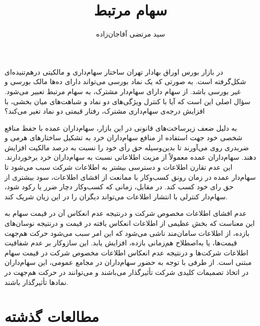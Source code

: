 \documentclass[12pt]{article}
\begin{document}
\title{سهام مرتبط}
\author{سید مرتضی آقاجان‌زاده}
\maketitle

در بازار بورس اوراق بهادار تهران ساختار سهام‌داری و مالکیتی درهم‌تنیده‌ای شکل‌گرفته است. به صورتی که یک نماد بورسی می‌تواند دارای ده‌ها مالک بورسی و غیر بورسی باشد. از سهام دارای سهام‌دار مشترک، به سهام مرتبط
 تعبیر می‌شود. سؤال اصلی این است که آیا با کنترل ویژگی‌های دو نماد و شباهت‌های میان بخشی، با افزایش درجه‌ی سهام‌داری مشترک، رفتار قیمتی دو نماد تغیر می‌کند؟ 

به دلیل ضعف زیرساخت‌های قانونی در این بازار، سهام‌داران عمده با حفظ منافع شخصی خود جهت استفاده از منافع سهام‌داران خرد به تشکیل ساختارهای هرمی 
و ضربدری 
روی می‌آورند تا بدین‌وسیله  حق رأی خود را نسبت به درصد مالکیت افزایش دهند. سهام‌داران عمده معمولاً از مزیت اطلاعاتی نسبت به سهام‌داران خرد برخوردارند.
این عدم تقارن اطلاعات و دسترسی بیشتر به اطلاعات شرکت سبب می‌شود تا سهام‌دار عمده در زمان رونق کسب‌وکار با ممانعت از افشای اطلاعات، سود بیشتری از حق رای خود کسب کند. در مقابل، زمانی که کسب‌وکار دچار ضرر یا رکود شود، سهام‌دار کنترلی با انتشار اطلاعات می‌تواند دیگران را در این زیان شریک کند.


عدم افشای اطلاعات مخصوص شرکت و درنتیجه عدم انعکاس آن در قیمت سهام به این معناست که بخش عظیمی از اطلاعات انعکاس یافته در قیمت و درنتیجه نوسان‌های بازده، از اطلاعات سامان‌مند ناشی می‌شود که این امر سبب می‌شود حرکت هم‌جهت قیمت‌ها، یا به‌اصطلاح هم‌زمانی بازده، افزایش یابد. این سازوکار بر عدم شفافیت اطلاعات شرکت‌ها و درنتیجه عدم انعکاس اطلاعات مخصوص شرکت در قیمت سهام مبتنی است. از طرفی با توجه به حضور سهام‌داران در مجامع عمومی، این سهام‌داران در اتخاذ تصمیمات کلیدی شرکت تأثیرگذار می‌باشند و می‌توانند در حرکت هم‌جهت در نماد‌ها تأثیرگذار باشند.




\section{مطالعات گذشته}
\subsection{}
\label{s1.1}
\end{document}
